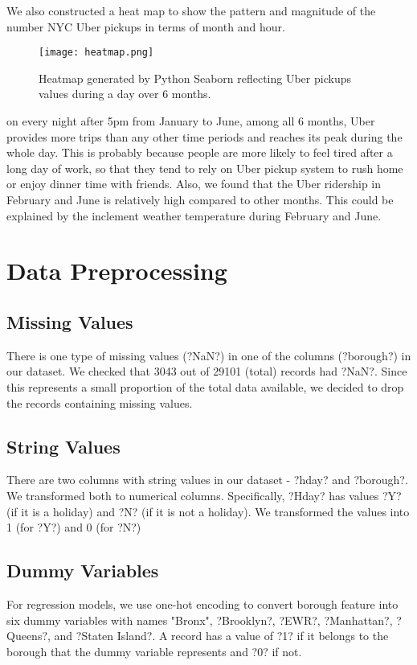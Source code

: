 \documentclass[article, 10 pt, conference]{ieeeconf}
\begin{document}
We also constructed a heat map to show the pattern and magnitude of the number NYC Uber pickups in terms of month and hour.
\begin{figure}[!htb]
    \texttt{[image: heatmap.png]}
    \caption{Heatmap generated by Python Seaborn  reflecting Uber pickups values during a day over 6 months.}
\end{figure}
on every night after 5pm from January to June, among all 6 months, Uber provides more trips than any other time periods and reaches its peak during the whole day. This is probably because people are more likely to feel tired after a long day of work, so that they tend to rely on Uber pickup system to rush home or enjoy dinner time with friends. Also, we found that the Uber ridership in February and June is relatively high compared to other months. This could be explained by the inclement weather temperature during February and June.


\section{Data Preprocessing}

\subsection{Missing Values} 

There is one type of missing values (?NaN?) in one of the columns (?borough?) in our dataset. We checked that 3043 out of 29101 (total) records had ?NaN?. Since this represents a small proportion of the total data available, we decided to drop the records containing missing values. 

\subsection{String Values} 

There are two columns with string values in our dataset - ?hday? and ?borough?. We transformed both to numerical columns. Specifically, ?Hday? has values ?Y? (if it is a holiday) and ?N? (if it is not a holiday). We transformed the values into 1 (for ?Y?) and 0 (for ?N?)

\subsection{Dummy Variables}

For regression models, we use one-hot encoding to convert borough feature into six dummy variables with names "Bronx", ?Brooklyn?, ?EWR?, ?Manhattan?, ?Queens?, and ?Staten Island?. A record has a value of ?1? if it belongs to the borough that the dummy variable represents and ?0? if not.
\end{document}
